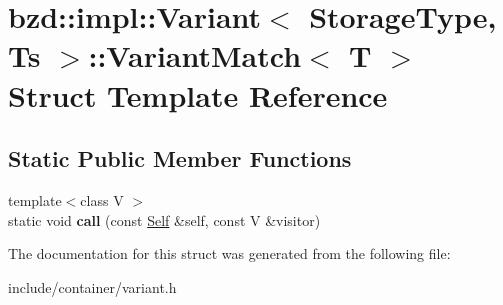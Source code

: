\hypertarget{structbzd_1_1impl_1_1Variant_1_1VariantMatch}{}\section{bzd\+:\+:impl\+:\+:Variant$<$ Storage\+Type, Ts $>$\+:\+:Variant\+Match$<$ T $>$ Struct Template Reference}
\label{structbzd_1_1impl_1_1Variant_1_1VariantMatch}
\subsection*{Static Public Member Functions}
\begin{DoxyCompactItemize}
\item 
\mbox{\label{structbzd_1_1impl_1_1Variant_1_1VariantMatch_abeaa30e810772b21a3dde9dd6566ee62}} 
{\footnotesize template$<$class V $>$ }\\static void {\bfseries call} (const \hyperlink{classbzd_1_1impl_1_1Variant}{Self} \&self, const V \&visitor)
\end{DoxyCompactItemize}


The documentation for this struct was generated from the following file\+:\begin{DoxyCompactItemize}
\item 
include/container/variant.\+h\end{DoxyCompactItemize}
